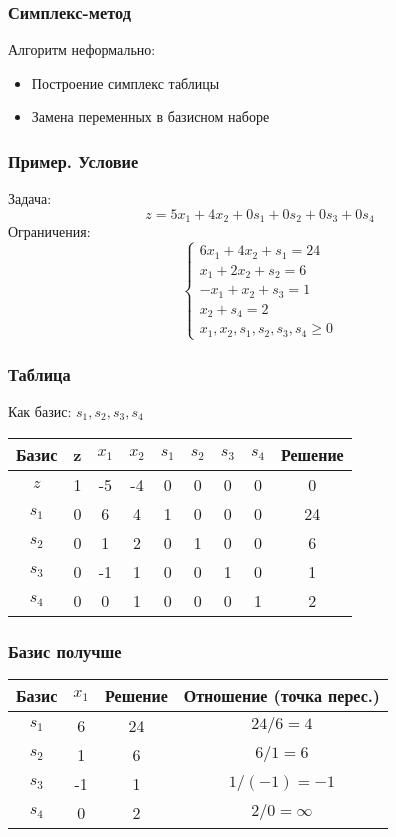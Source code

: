 \documentclass[12pt]{beamer}
\begin{document}
\begin{frame}
	\frametitle{Симплекс-метод}
Алгоритм неформально: 
\begin{itemize}
	\item Построение симплекс таблицы
	\item Замена переменных в базисном наборе
\end{itemize}
\end{frame}
\begin{frame}
	\frametitle{Пример. Условие}
Задача:
\[z=5x_1+4x_2+0s_1+0s_2+0s_3+0s_4\]
Ограничения: 
\begin{equation}
	\begin{cases}	
		6x_1+4x_2+s_1= 24\\
		x_1+2x_2+s_2= 6\\
		-x_1+x_2+s_3=1\\
		x_2+s_4=2\\
		x_1,x_2,s_1,s_2,s_3,s_4\geq0
	\end{cases}
\end{equation}
\end{frame}
\begin{frame}
	\frametitle{Таблица}
	Как базис: $s_1,s_2,s_3,s_4$
	
	\begin{tabular}{|c|c|c|c|c|c|c|c|c|}
		\hline
		Базис & z  & $x_1$ & $x_2$  & $s_1$  & $s_2$  & $s_3$  & $s_4$  & Решение \\
		\hline
		$z $& 1  &  -5 & -4 & 0 & 0  & 0  & 0 & 0 \\
		\hline
		$s_1$& 0 & 6 & 4  & 1  & 0 & 0 & 0 & 24 \\
		
		$s_2$& 0 & 1 & 2 & 0 & 1 & 0 & 0 & 6 \\
		
		$s_3$& 0 & -1 & 1 & 0 & 0 & 1 & 0 & 1 \\
		
		$s_4$& 0 & 0 & 1 & 0 & 0 & 0 & 1 & 2 \\ 
		\hline
	\end{tabular}
\end{frame}
\begin{frame}
	\frametitle{Базис получше}
	\begin{tabular}{|c|c|c|c|}
		\hline
		Базис & $x_1$  & Решение & Отношение (точка перес.)  \\
		\hline
		
		$s_1$& 6 & 24 & $24/6=4$  \\
		
		$s_2$& 1 & 6 & $6/1=6$ \\
		
		$s_3$& -1 & 1 & $1/(-1)=-1$ \\
		
		$s_4$& 0 & 2 & $2/0=\infty$ \\ 
		\hline
	\end{tabular}
\end{frame}
\end{document}
